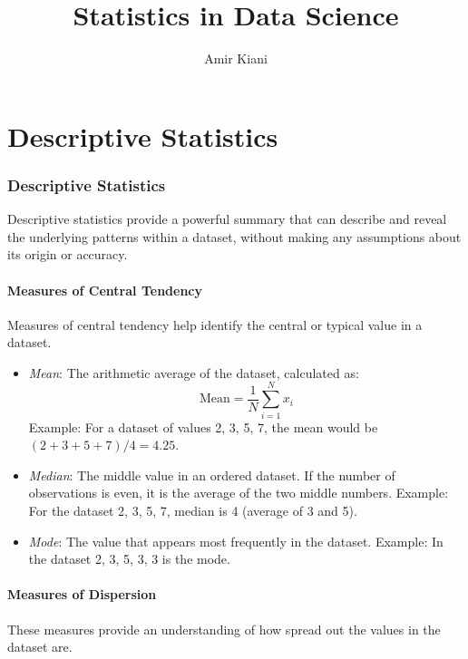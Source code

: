 \documentclass{article}
\title{Statistics in Data Science}
\author{Amir Kiani}
\theoremstyle{definition}
\theoremstyle{theorem}
\theoremstyle{theorem}
\theoremstyle{theorem}
\theoremstyle{theorem}
\theoremstyle{definition}
\theoremstyle{definition}
\theoremstyle{definition}
\theoremstyle{definition}
\theoremstyle{definition}
\begin{document}
\maketitle

\tableofcontents
\newpage

\part{Descriptive Statistics}

\section{Descriptive Statistics}

Descriptive statistics provide a powerful summary that can describe and reveal the underlying patterns within a dataset, without making any assumptions about its origin or accuracy.

\subsection{Measures of Central Tendency}

Measures of central tendency help identify the central or typical value in a dataset.

\begin{itemize}
    \item \textit{Mean}: The arithmetic average of the dataset, calculated as:
    \[
    \text{Mean} = \frac{1}{N} \sum_{i=1}^{N} x_i
    \]
    Example: For a dataset of values 2, 3, 5, 7, the mean would be \((2+3+5+7)/4 = 4.25\).

    \item \textit{Median}: The middle value in an ordered dataset. If the number of observations is even, it is the average of the two middle numbers.
    Example: For the dataset 2, 3, 5, 7, median is 4 (average of 3 and 5).

    \item \textit{Mode}: The value that appears most frequently in the dataset.
    Example: In the dataset 2, 3, 5, 3, 3 is the mode.
\end{itemize}

\subsection{Measures of Dispersion}

These measures provide an understanding of how spread out the values in the dataset are.
\end{document}
